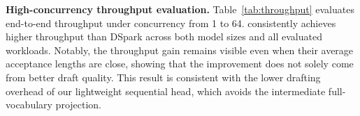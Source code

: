 



\textbf{High-concurrency throughput evaluation.} Table~\ref{tab:throughput} evaluates end-to-end throughput under concurrency from 1 to 64. \we consistently achieves higher throughput than DSpark across both model sizes and all evaluated workloads. Notably, the throughput gain remains visible even when their average acceptance lengths are close, showing that the improvement does not solely come from better draft quality. This result is consistent with the lower drafting overhead of our lightweight sequential head, which avoids the intermediate full-vocabulary projection.

